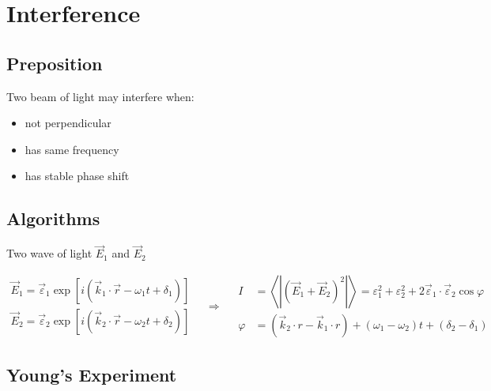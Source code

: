 \chapter{Interference}

\section{Preposition}

Two beam of light may interfere when:

\begin{itemize}
\item not perpendicular
\item has same frequency
\item has stable phase shift
\end{itemize}

\section{Algorithms}

Two wave of light $\vec{E}_1$ and $\vec{E}_2$

\begin{equation*}
  \begin{aligned}
    \vec{E}_1 = \vec{\varepsilon}_1 \exp \left[ i \left( \vec{k}_1 \cdot \vec{r} - \omega_1 t + \delta_1 \right) \right] \\
    \vec{E}_2 = \vec{\varepsilon}_2 \exp \left[ i \left( \vec{k}_2 \cdot \vec{r} - \omega_2 t + \delta_2 \right) \right]
  \end{aligned}
  \quad \Rightarrow \quad 
  \begin{aligned}
    I &= \left< \left| \left( \vec{E}_1 + \vec{E}_2 \right)^2 \right| \right> = \varepsilon_1^2 + \varepsilon_2^2 + 2 \vec{\varepsilon}_1 \cdot \vec{\varepsilon}_2 \cos \varphi \\
    \varphi &= \left( \vec{k}_2 \cdot r - \vec{k}_1 \cdot r \right) + \left( \omega_1 - \omega_2 \right) t + \left( \delta_2 - \delta_1 \right)
  \end{aligned}
\end{equation*}

\section{Young's Experiment}

